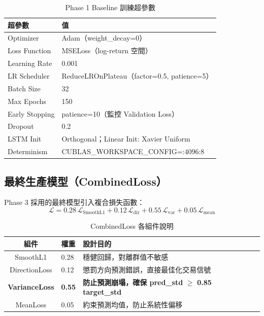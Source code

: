 \documentclass[12pt,a4paper]{article}
\begin{document}
\begin{table}[H]
\centering
\caption{Phase 1 Baseline 訓練超參數}
\begin{tabular}{ll}
\toprule
\textbf{超參數} & \textbf{值} \\
\midrule
Optimizer        & Adam（weight\_decay=0） \\
Loss Function    & MSELoss（log-return 空間） \\
Learning Rate    & 0.001 \\
LR Scheduler     & ReduceLROnPlateau（factor=0.5, patience=5） \\
Batch Size       & 32 \\
Max Epochs       & 150 \\
Early Stopping   & patience=10（監控 Validation Loss） \\
Dropout          & 0.2 \\
LSTM Init        & Orthogonal；Linear Init: Xavier Uniform \\
Determinism      & CUBLAS\_WORKSPACE\_CONFIG=:4096:8 \\
\bottomrule
\end{tabular}
\end{table}

\subsection{最終生產模型（CombinedLoss）}

Phase 3 採用的最終模型引入複合損失函數：
\begin{equation}
  \mathcal{L} = 0.28\,\mathcal{L}_{\text{SmoothL1}} + 0.12\,\mathcal{L}_{\text{dir}} + 0.55\,\mathcal{L}_{\text{var}} + 0.05\,\mathcal{L}_{\text{mean}}
\end{equation}

\begin{table}[H]
\centering
\caption{CombinedLoss 各組件說明}
\begin{tabular}{clll}
\toprule
\textbf{組件} & \textbf{權重} & \textbf{設計目的} \\
\midrule
SmoothL1     & 0.28 & 穩健回歸，對離群值不敏感 \\
DirectionLoss & 0.12 & 懲罰方向預測錯誤，直接最佳化交易信號 \\
\textbf{VarianceLoss} & \textbf{0.55} & \textbf{防止預測崩塌，確保 pred\_std} $\geq$ \textbf{0.85 target\_std} \\
MeanLoss     & 0.05 & 約束預測均值，防止系統性偏移 \\
\bottomrule
\end{tabular}
\end{table}
\end{document}
